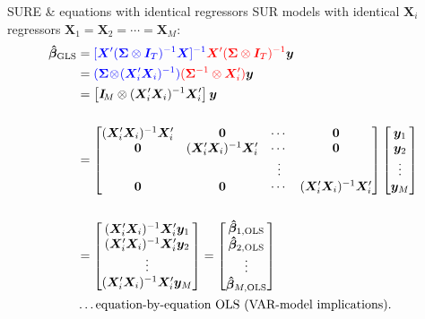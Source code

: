 \documentclass[usenames,dvipsnames]{beamer}
\begin{document}
\begin{frame}{SURE \& equations with identical regressors}
\small
SUR models with identical $\bm{X}_i$ regressors $\bm{X}_1=\bm{X}_2=\cdots=\bm{X}_M$:\\
\begin{align*}
    \bm{\hat{\beta}}_{\textnormal{GLS}} &= \textcolor{blue}{[\bm{X}^{\prime} (\bm{\Sigma} \otimes \bm{I}_T)^{-1} \bm{X}]^{-1}} \textcolor{red}{\bm{X}^{\prime} (\bm{\Sigma} \otimes \bm{I}_T)^{-1}} \bm{y} \\
    &= \textcolor{blue}{(\bm{\Sigma} \! \otimes \! (\bm{X}_i^{\prime}\bm{X}_i)^{-1})}\textcolor{red}{(\bm{\Sigma}^{-1} \otimes \bm{X}_i^{\prime})}\bm{y}\\
    &=\left[ \bm{I}_{\!M} \otimes (\bm{X}_i^{\prime}\bm{X}_i)^{-1}\bm{X}_i^{\prime}\right]\bm{y} \\ &~ \\
    &= \begin{bmatrix} 
    (\bm{X}_i^{\prime}\bm{X}_i)^{-1}\bm{X}_i^{\prime} & \bm{0} & \cdots & \bm{0} \\
    \bm{0} & (\bm{X}_i^{\prime}\bm{X}_i)^{-1}\bm{X}_i^{\prime} & \cdots & \bm{0} \\ 
      &   & \vdots &  \\ 
    \bm{0} & \bm{0} & \cdots & (\bm{X}_i^{\prime}\bm{X}_i)^{-1}\bm{X}_i^{\prime}\\ 
    \end{bmatrix}
    \begin{bmatrix}
    \bm{y}_1 \\ \bm{y}_2 \\ \vdots \\ \bm{y}_M \\ 
    \end{bmatrix}\\ &~ \\
    &= \begin{bmatrix}
    (\bm{X}_i^{\prime}\bm{X}_i)^{-1}\bm{X}_i^{\prime} \bm{y}_1 \\
    (\bm{X}_i^{\prime}\bm{X}_i)^{-1}\bm{X}_i^{\prime} \bm{y}_2 \\
  \vdots \\
    (\bm{X}_i^{\prime}\bm{X}_i)^{-1}\bm{X}_i^{\prime} \bm{y}_M
    \end{bmatrix} = 
    \begin{bmatrix}
    \bm{\hat{\beta}}_{1,\textnormal{OLS}} \\ \bm{\hat{\beta}}_{2,\textnormal{OLS}} \\ \vdots \\ \bm{\hat{\beta}}_{M,\textnormal{OLS}} \\ 
    \end{bmatrix}\\
    &\dots \textnormal{equation-by-equation OLS (VAR-model implications).}
\end{align*} 
\end{frame}
\end{document}
